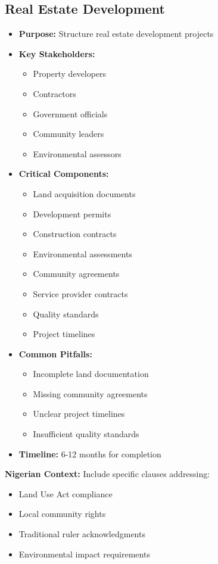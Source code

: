 \subsection{Real Estate Development}
\begin{tcolorbox}[colback=white,colframe=primarydark,title=\textbf{Real Estate Documentation}]
\begin{itemize}
    \item \textbf{Purpose:} Structure real estate development projects
    \item \textbf{Key Stakeholders:}
    \begin{itemize}
        \item Property developers
        \item Contractors
        \item Government officials
        \item Community leaders
        \item Environmental assessors
    \end{itemize}
    \item \textbf{Critical Components:}
    \begin{itemize}
        \item Land acquisition documents
        \item Development permits
        \item Construction contracts
        \item Environmental assessments
        \item Community agreements
        \item Service provider contracts
        \item Quality standards
        \item Project timelines
    \end{itemize}
    \item \textbf{Common Pitfalls:}
    \begin{itemize}
        \item Incomplete land documentation
        \item Missing community agreements
        \item Unclear project timelines
        \item Insufficient quality standards
    \end{itemize}
    \item \textbf{Timeline:} 6-12 months for completion
\end{itemize}

\textbf{Nigerian Context:}
Include specific clauses addressing:
\begin{itemize}
    \item Land Use Act compliance
    \item Local community rights
    \item Traditional ruler acknowledgments
    \item Environmental impact requirements
\end{itemize}
\end{tcolorbox}

